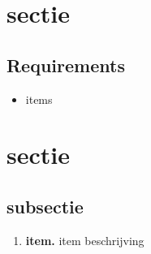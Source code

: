 \documentclass[11pt,a4paper]{article}
\newcommand\litem[1]{\item{\bfseries#1.\space}}
\begin{document}
	\section{sectie}
		
		\subsection{Requirements}
			\begin{itemize}
				\item items
			\end{itemize}
	
	\section{sectie}
	
	\subsection{subsectie}
	
		
			\begin{enumerate}[label=\emph{\alph*)}]
				\litem{item} item beschrijving
			\end{enumerate}
	
	\begin{lstlisting}
\end{lstlisting}

	
	
\end{document}
